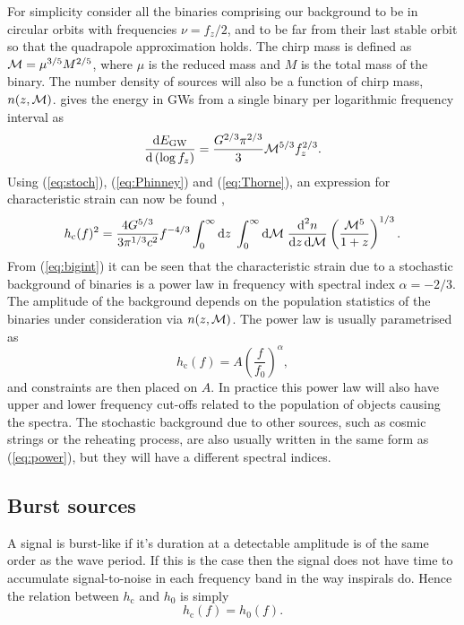 \documentclass[fleqn,12pt]{iopart}
\newcommand{\dd}{\ensuremath{\mathrm{d}}}
\newcommand{\sub}[1]{\ensuremath{_\mathrm{#1}}}
\begin{document}
For simplicity consider all the binaries comprising our background to be in circular orbits with frequencies $\nu = f_{z}/2$, and to be far from their last stable orbit so that the quadrapole approximation holds. The chirp mass is defined as ${\cal{M}} = \mu^{3/5}M^{2/5}$, where $\mu$ is the reduced mass and $M$ is the total mass of the binary. The number density of sources will also be a function of chirp mass, $n(z,{\cal{M}})$. \citep{Thorne} gives the energy in GWs from a single binary per logarithmic frequency interval as
\begin{equation}\label{eq:Thorne}
\frac{\dd E\sub{GW}}{\dd\left(\log f_z \right)} = \frac{G^{2/3}\pi^{2/3}}{3}{\cal{M}}^{5/3}f_{z}^{2/3}.
\end{equation}
Using (\ref{eq:stoch}), (\ref{eq:Phinney}) and (\ref{eq:Thorne}), an expression for characteristic strain can now be found \citep{SesanaVecchioColancino},
\begin{equation}\label{eq:bigint}
h\sub{c}(f)^{2}=\frac{4G^{5/3}}{3\pi^{1/3}c^{2}}f^{-4/3}\int_{0}^{\infty}\textrm{d}z\;\int_{0}^{\infty}\textrm{d}{\cal{M}}\;\frac{\textrm{d}^{2}n}{\textrm{d}z\,\textrm{d}{\cal{M}}}\left( \frac{{\cal{M}}^{5}}{1+z} \right)^{1/3}.
\end{equation}
From (\ref{eq:bigint}) it can be seen that the characteristic strain due to a stochastic background of binaries is a power law in frequency with spectral index $\alpha = -2/3$. The amplitude of the background depends on the population statistics of the binaries under consideration via $n(z,{\cal{M}})$. The power law is usually parametrised as
\begin{equation}\label{eq:power}
h\sub{c}(f)= A\left(\frac{f}{f_{0}}\right)^{\alpha},
\end{equation}
and constraints are then placed on $A$. In practice this power law will also have upper and lower frequency cut-offs related to the population of objects causing the spectra. The stochastic background due to other sources, such as cosmic strings or the reheating process, are also usually written in the same form as (\ref{eq:power}), but they will have a different spectral indices.

\subsection{Burst sources}

A signal is burst-like if it's duration at a detectable amplitude is of the same order as the wave period. If this is the case then the signal does not have time to accumulate signal-to-noise in each frequency band in the way inspirals do. Hence the relation between $h\sub{c}$ and $h_{0}$ is simply
\begin{equation}\label{eq:simple}
h\sub{c}(f) = h_{0}(f).
\end{equation}
\end{document}
